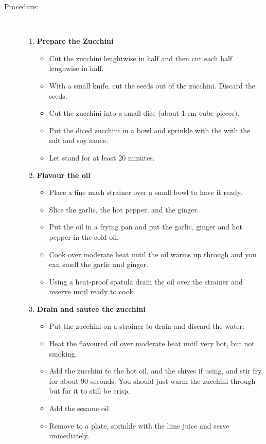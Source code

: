 \documentclass[11pt,letterpaper]{article}
\newcommand \fileName {AsianZucchini}
\begin{document}
\begin{description}
\item[Procedure:]\ \\
	\begin{enumerate}
	\item {\bf Prepare the Zucchini}
	\begin{itemize}
	\item Cut the zucchini lenghtwise in half and then cut each half lenghwise in half.
	\item With a small knife, cut the seeds out of the zucchini. Discard the seeds.
	\item Cut the zucchini into a small dice (about 1 cm cube pieces).
	\item  Put the diced zucchini in a bowl and sprinkle with the with the salt and soy sauce.
	\item Let stand for at least 20 minutes.
	\end{itemize}
	\item {\bf Flavour the oil}
	\begin{itemize}
        \item Place a fine mash strainer over a small bowl to have it ready.
	\item Slice the garlic, the hot pepper, and the ginger.
	\item Put the oil in a frying pan and put the garlic, ginger and hot pepper in the cold oil.
	\item Cook over moderate heat until the oil warms up through and you can smell the garlic and ginger.
	\item Using a heat-proof spatula drain the oil over the strainer and reserve until ready to cook.
	\end{itemize}
	\item{\bf Drain and sautee the zucchini}
	\begin{itemize}
	\item Put the zucchini on a strainer to drain and discard the water.
	\item Heat the flavoured oil over moderate heat until very hot, but not smoking.
	\item Add the zucchini to the hot oil, and the chives if using, and stir fry for about 90 seconds. You should just warm the zucchini through but for it to still be crisp.
        \item Add the sesame oil
	\item Remove to a plate, sprinkle with the lime juice and serve immediately.	
	\end{itemize}
	\end{enumerate}
\end{description}

\end{document}
